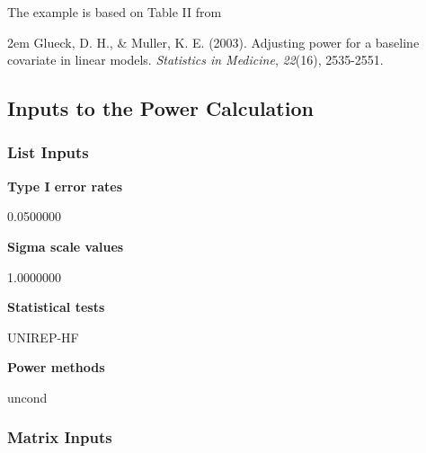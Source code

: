 \documentclass{glimmpse-report}
\begin{document}
The example is based on Table II from

\hangindent2em
 Glueck, D. H., \& Muller, K. E. (2003). Adjusting power for a baseline covariate in linear models. \emph{Statistics in Medicine}, \emph{22}(16), 2535-2551.


\subsection{Inputs to the Power Calculation}
\subsubsection{List Inputs}

{\bf Type I error rates}

0.0500000

{\bf Sigma scale values}

1.0000000

{\bf Statistical tests}

UNIREP-HF

{\bf Power methods}

uncond

\subsubsection{Matrix Inputs}
\end{document}
